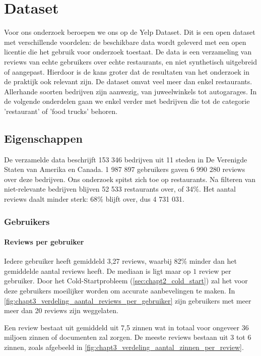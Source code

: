 \chapter{Dataset}
\label{sec:chapt3}

Voor ons onderzoek beroepen we ons op de Yelp Dataset. Dit is een open dataset met verschillende voordelen: de beschikbare data wordt geleverd met een open licentie die het gebruik voor onderzoek toestaat. \cite{Yelp_Dataset} De data is een verzameling van reviews van echte gebruikers over echte restaurants, en niet synthetisch uitgebreid of aangepast. Hierdoor is de kans groter dat de resultaten van het onderzoek in de praktijk ook relevant zijn. De dataset omvat veel meer dan enkel restaurants. Allerhande soorten bedrijven zijn aanwezig, van juweelwinkels tot autogarages. In de volgende onderdelen gaan we enkel verder met bedrijven die tot de categorie 'restaurant' of 'food trucks' behoren. 

\section{Eigenschappen}
\label{sub:chapt3_eigenschappen_dataset}
De verzamelde data beschrijft 153 346 bedrijven uit 11 steden in De Verenigde Staten van Amerika en Canada. 1 987 897 gebruikers gaven 6 990 280 reviews over deze bedrijven. Ons onderzoek spitst zich toe op restaurants. Na filteren van niet-relevante bedrijven blijven 52 533 restaurants over, of 34\%. Het aantal reviews daalt minder sterk: 68\% blijft over, dus 4 731 031.

\subsection{Gebruikers}
\subsubsection{Reviews per gebruiker}
\label{sec:chapt3_reviews_per_gebruiker}
Iedere gebruiker heeft gemiddeld 3,27 reviews, waarbij 82\% minder dan het gemiddelde aantal reviews heeft. De mediaan is ligt maar op $1$ review per gebruiker. Door het Cold-Startprobleem (\ref{sec:chapt2_cold_start}) zal het voor deze gebruikers moeilijker worden om accurate aanbevelingen te maken. In \autoref{fig:chapt3_verdeling_aantal_reviews_per_gebruiker} zijn gebruikers met meer meer dan 20 reviews zijn weggelaten.

Een review bestaat uit gemiddeld uit 7,5 zinnen wat in totaal voor ongeveer 36 miljoen zinnen of documenten zal zorgen. De meeste reviews bestaan uit 3 tot 6 zinnen, zoals afgebeeld in \autoref{fig:chapt3_verdeling_aantal_zinnen_per_review}.

